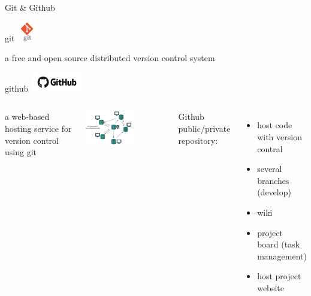 \documentclass[8pt,ignorenonframetext,]{beamer}
\providecommand{\tightlist}{%
  \setlength{\itemsep}{0pt}\setlength{\parskip}{0pt}}
\newcommand{\columnsbegin}{\begin{columns}}
\newcommand{\columnsend}{\end{columns}}
\begin{document}
\begin{frame}{Git \& Github}

\begin{block}{git
\includegraphics[height=0.33333in]{imgPres/input/git-logo.png}}

a free and open source distributed version control system

\end{block}

\begin{block}{github
\includegraphics[height=0.33333in]{imgPres/input/github-logo.png}}

\columnsbegin
{}

a web-based hosting service for version control using git

\includegraphics[width=0.60000\textwidth]{imgPres/input/distributed-vc.png}


Github public/private repository:

\begin{itemize}
\tightlist
\item
  host code with version contral
\item
  several branches (develop)
\item
  wiki
\item
  project board (task management)
\item
  host project website
\end{itemize}

\columnsend

\end{block}

\end{frame}
\end{document}
